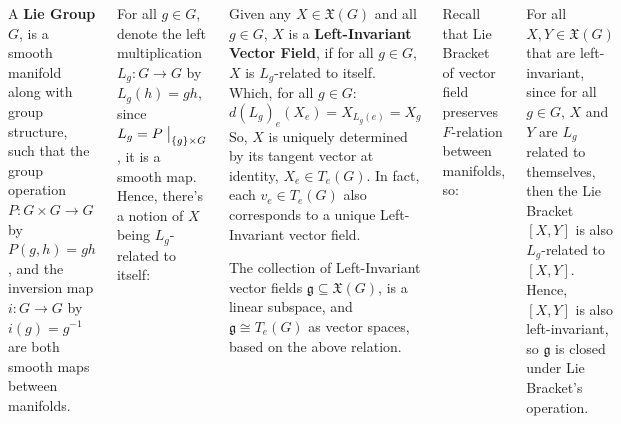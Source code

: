 \documentclass[20pt,margin=0.9in,innermargin=-4.5in,blockverticalspace=-0.25in]{tikzposter}
\begin{document}
\begin{columns}
{        \begin{definitionBox}
            A \textbf{Lie Group} $G$, is a smooth manifold along with group structure, such that the group operation $P:G\times G\rightarrow G$ by $P(g,h) = gh$, and the inversion map $i:G\rightarrow G$ by $i(g)=g^{-1}$ are both smooth maps between manifolds.
        \end{definitionBox}

        For all $g\in G$, denote the left multiplication $L_g:G\rightarrow G$ by $L_g(h)=gh$,
        since $L_g = P\bigm|_{\{g\}\times G}$, it is a smooth map. Hence, there's a notion of $X$ being $L_g$-related to itself:

        \begin{definitionBox}
            Given any $X\in\mathfrak{X}(G)$ and all $g\in G$, $X$ is a \textbf{Left-Invariant Vector Field}, if for all $g\in G$, $X$ is $L_g$-related to itself. Which, for all $g\in G$: 
            $$d(L_g)_e(X_e) = X_{L_g(e)} = X_g$$ 
            So, $X$ is uniquely determined by its tangent vector at identity, $X_e\in T_e(G)$. In fact, each $v_e\in T_e(G)$ also corresponds to a unique Left-Invariant vector field.

            The collection of Left-Invariant vector fields $\mathfrak{g}\subseteq \mathfrak{X}(G)$, is a linear subspace, and $\mathfrak{g}\cong T_e(G)$ as vector spaces, based on the above relation.
            
        \end{definitionBox}

        Recall that Lie Bracket of vector field preserves $F$-relation between manifolds, so:
        \begin{theoremBox}
            For all $X,Y\in\mathfrak{X}(G)$ that are left-invariant, since for all $g\in G$, $X$ and $Y$ are $L_g$ related to themselves, then the Lie Bracket $[X,Y]$ is also $L_g$-related to $[X,Y]$. Hence, $[X,Y]$ is also left-invariant, so $\mathfrak{g}$ is closed under Lie Bracket's operation.
        \end{theoremBox}
    }


\end{columns}
\end{document}
